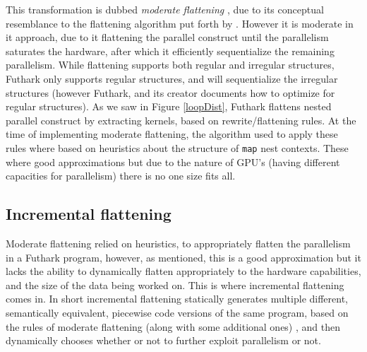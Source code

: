 This transformation is dubbed \textit{moderate flattening} \cite{futhark-nested-para}, due to its conceptual resemblance to the flattening algorithm put forth by \citeauthor{flat} \cite{flat}. However it is moderate in it approach, due to it flattening the parallel construct until the parallelism saturates the hardware, after which it efficiently sequentialize the remaining parallelism. While flattening supports both regular and irregular structures, Futhark only supports regular structures, and will sequentialize the irregular structures (however Futhark, and its creator documents how to optimize for regular structures). As we saw in Figure \ref{loopDist}, Futhark flattens nested parallel construct by extracting kernels, based on rewrite/flattening rules. At the time of implementing moderate flattening, the algorithm used to apply these rules where based on heuristics about the structure of \texttt{map} nest contexts. These where good approximations but due to the nature of GPU's (having different capacities for parallelism) there is no one size fits all. 


\subsection{Incremental flattening}
Moderate flattening relied on heuristics, to appropriately flatten the parallelism in a Futhark program, however, as mentioned, this is a good approximation but it lacks the ability to dynamically flatten appropriately to the hardware capabilities, and the size of the data being worked on. This is where incremental flattening comes in. In short incremental flattening statically generates multiple different, semantically equivalent, piecewise code versions of the same program, based on the rules of moderate flattening (along with some additional ones) \cite{inc-flat}, and then dynamically chooses whether or not to further exploit parallelism or not.  

